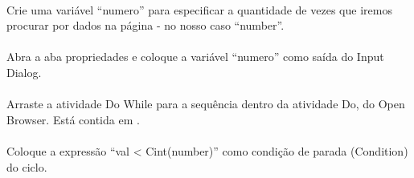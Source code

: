 \documentclass[letterpaper,10pt,brazil]{sphinxmanual}
\begin{document}
\begin{figure}[htbp]
\centering

\noindent{}
\end{figure}


\paragraph{}
\label{\detokenize{exercise_2:viii-criar-variavel-que-alocara-numero-de-ciclos}}
Crie uma variável “numero” para especificar a quantidade de vezes que iremos procurar por dados na página - no nosso caso “number”.

\begin{figure}[htbp]
\centering

\noindent{}
\end{figure}


\paragraph{}
\label{\detokenize{exercise_2:ix-configure-a-saida-do-input-dialog}}
Abra a aba propriedades e coloque a variável “numero” como saída do Input Dialog.

\begin{figure}[htbp]
\centering

\noindent{}
\end{figure}


\paragraph{}
\label{\detokenize{exercise_2:x-criar-loop-do-while}}
Arraste a atividade Do While para a sequência dentro da atividade Do, do Open Browser. Está contida em .

\begin{figure}[htbp]
\centering

\noindent{}
\end{figure}


\paragraph{}
\label{\detokenize{exercise_2:xi-adicionar-condicao-de-parada}}
Coloque a expressão “val \textless{} Cint(number)” como condição de parada (Condition) do ciclo.
\begin{quote}

\begin{figure}[htbp]
\centering

\noindent{}
\end{figure}
\end{quote}
\end{document}
